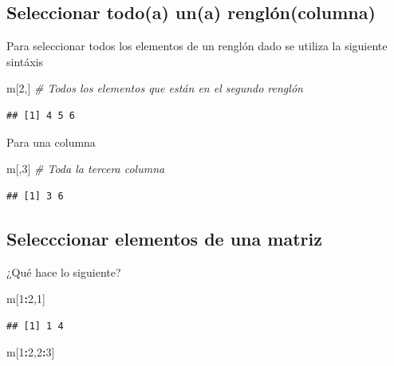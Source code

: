 \documentclass[
]{book}
\newenvironment{Shaded}{\begin{snugshade}}{\end{snugshade}}
\newcommand{\CommentTok}[1]{\textcolor[rgb]{0.56,0.35,0.01}{\textit{#1}}}
\newcommand{\DecValTok}[1]{\textcolor[rgb]{0.00,0.00,0.81}{#1}}
\newcommand{\NormalTok}[1]{#1}
\newcommand{\SpecialCharTok}[1]{\textcolor[rgb]{0.81,0.36,0.00}{\textbf{#1}}}
\begin{document}
\hypertarget{seleccionar-todoa-una-rengluxf3ncolumna}{%
\subsection{Seleccionar todo(a) un(a) renglón(columna)}\label{seleccionar-todoa-una-rengluxf3ncolumna}}

Para seleccionar todos los elementos de un renglón dado se utiliza la siguiente sintáxis

\begin{Shaded}
\begin{Highlighting}[]
\NormalTok{m[}\DecValTok{2}\NormalTok{,]  }\CommentTok{\# Todos los elementos que están en el segundo renglón}
\end{Highlighting}
\end{Shaded}

\begin{verbatim}
## [1] 4 5 6
\end{verbatim}

Para una columna

\begin{Shaded}
\begin{Highlighting}[]
\NormalTok{m[,}\DecValTok{3}\NormalTok{] }\CommentTok{\# Toda la tercera columna}
\end{Highlighting}
\end{Shaded}

\begin{verbatim}
## [1] 3 6
\end{verbatim}

\hypertarget{selecccionar-elementos-de-una-matriz}{%
\subsection{Selecccionar elementos de una matriz}\label{selecccionar-elementos-de-una-matriz}}

¿Qué hace lo siguiente?

\begin{Shaded}
\begin{Highlighting}[]
\NormalTok{m[}\DecValTok{1}\SpecialCharTok{:}\DecValTok{2}\NormalTok{,}\DecValTok{1}\NormalTok{]}
\end{Highlighting}
\end{Shaded}

\begin{verbatim}
## [1] 1 4
\end{verbatim}

\begin{Shaded}
\begin{Highlighting}[]
\NormalTok{m[}\DecValTok{1}\SpecialCharTok{:}\DecValTok{2}\NormalTok{,}\DecValTok{2}\SpecialCharTok{:}\DecValTok{3}\NormalTok{]}
\end{Highlighting}
\end{Shaded}
\end{document}
